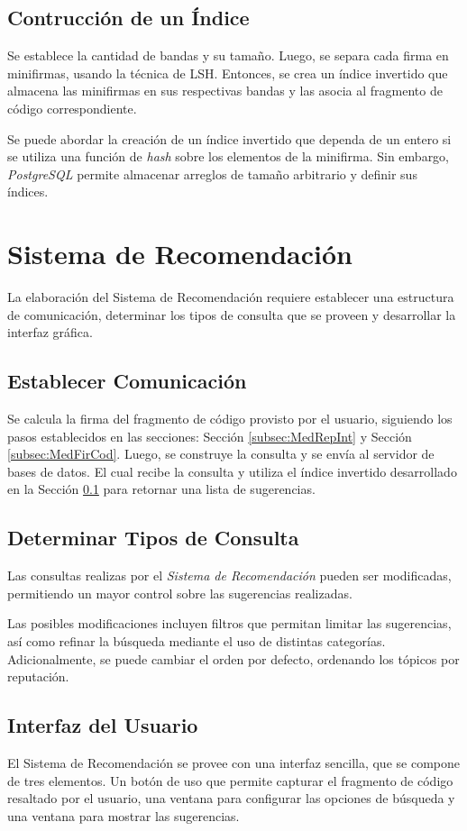 \subsection{Contrucción de un Índice}
\label{subsec:MedConInd}

Se establece la cantidad de bandas y su tamaño.
Luego, se separa cada firma en minifirmas,
usando la técnica de \ac{LSH}.
Entonces, se crea un índice invertido que almacena
las minifirmas en sus respectivas bandas
y las asocia al fragmento de código correspondiente.

Se puede abordar la creación de un índice invertido que
dependa de un entero si se utiliza una función de \textit{hash}
sobre los elementos de la minifirma.
Sin embargo, \textit{PostgreSQL} permite almacenar arreglos
de tamaño arbitrario y definir sus índices.

\section{Sistema de Recomendación}
\label{sec:MedConSisRec}

La elaboración del Sistema de Recomendación requiere establecer una estructura
de comunicación, determinar los tipos de consulta que se proveen y desarrollar
la interfaz gráfica.

\subsection{Establecer Comunicación}

Se calcula la firma del fragmento de código provisto por el usuario, 
siguiendo los pasos establecidos en las secciones:
Sección \ref{subsec:MedRepInt} y Sección \ref{subsec:MedFirCod}.
Luego, se construye la consulta y se envía al servidor de
bases de datos. El cual recibe la consulta y utiliza el
índice invertido desarrollado en la Sección \ref{subsec:MedConInd}
para retornar una lista de sugerencias.

\subsection{Determinar Tipos de Consulta}

Las consultas realizas por el \textit{Sistema de Recomendación} pueden
ser modificadas, permitiendo un mayor control sobre las 
sugerencias realizadas.

Las posibles modificaciones incluyen filtros que permitan
limitar las sugerencias, así como refinar la búsqueda
mediante el uso de distintas categorías.
Adicionalmente, se puede cambiar el orden por defecto,
ordenando los tópicos por reputación.

\subsection{Interfaz del Usuario}

El Sistema de Recomendación se provee con una interfaz
sencilla, que se compone de tres elementos.
Un botón de uso que permite capturar el fragmento de código
resaltado por el usuario, una ventana para
configurar las opciones de búsqueda y una 
ventana para mostrar las sugerencias.